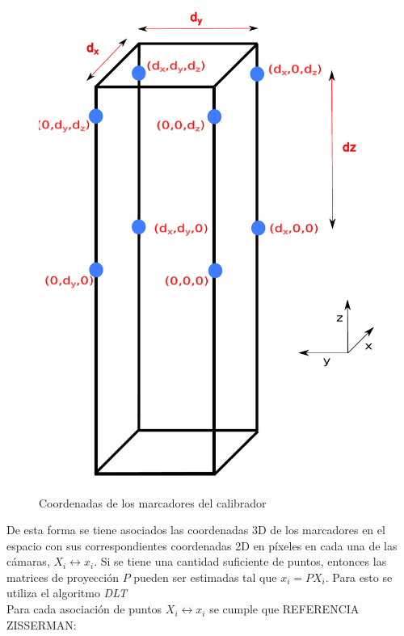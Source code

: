 \begin{figure}[H]
        \centering
     {\includegraphics[scale=0.4]{img/calibracion/medidas_calibrador.pdf}\label{fig: medidas_calibrador}}
     \caption{Coordenadas de los marcadores del calibrador}
     
\end{figure}

   De esta forma se tiene asociados las coordenadas 3D de los marcadores en el espacio con sus correspondientes coordenadas 2D en píxeles en cada una de las cámaras, $X_i \leftrightarrow x_i$. Si se tiene una cantidad suficiente de puntos, entonces las matrices de proyección $P$ pueden ser estimadas tal que $x_i=PX_i$. Para esto se utiliza el algoritmo \textit{DLT}\\
   
   Para cada asociación de puntos $X_i \leftrightarrow x_i$ se cumple que REFERENCIA ZISSERMAN:
   
